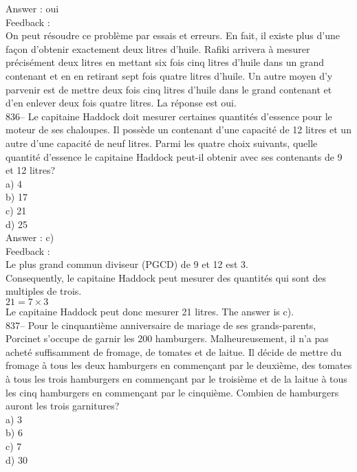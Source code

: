 ﻿\documentclass[letterpaper, 12pt]{article}
\begin{document}
Answer : oui\\

Feedback : \\
On peut r\'esoudre ce probl\`eme par essais et erreurs. En fait, il
existe plus d'une fa\c con d'obtenir exactement deux litres d'huile.
Rafiki arrivera \`a mesurer pr\'ecis\'ement deux litres en mettant
six fois cinq litres d'huile dans un grand contenant et en en
retirant sept fois quatre litres d'huile.  Un autre moyen d'y
parvenir est de mettre deux fois cinq litres d'huile
dans le grand contenant et d'en enlever deux fois quatre litres. La
r\'eponse est oui.\\

836-- Le capitaine Haddock doit mesurer certaines quantit\'es d'essence pour
le moteur de ses chaloupes.  Il poss\`ede un contenant d'une capacit\'e de
12 litres et un autre d'une capacit\'e de neuf litres.  Parmi les quatre
choix suivants, quelle quantit\'e d'essence le capitaine Haddock peut-il
obtenir avec ses contenants de 9 et 12 litres?\\
a) 4\\
b) 17\\
c) 21\\
d) 25\\

Answer : c)\\

Feedback : \\
Le plus grand commun diviseur (PGCD) de 9 et 12 est 3. \\
Consequently, le capitaine Haddock peut mesurer des quantit\'es qui sont
des multiples de trois.  \\
$21=7\times3$\\
Le capitaine Haddock peut donc mesurer 21 litres.  The answer is c).\\

837-- Pour le cinquanti\`eme anniversaire de mariage de ses grands-parents,
Porcinet s'occupe de garnir les 200 hamburgers.  Malheureusement, il n'a pas
achet\'e suffisamment de fromage, de tomates et de laitue.  Il d\'ecide de
mettre du fromage \`a tous les deux hamburgers en commen\c cant par le
deuxi\`eme, des tomates \`a tous les trois hamburgers en commen\c cant par
le troisi\`eme et de la laitue \`a tous les cinq hamburgers en commen\c cant
par le cinqui\`eme.  Combien de hamburgers auront les trois garnitures?\\
a) 3\\
b) 6\\
c) 7\\
d) 30\\
\end{document}
